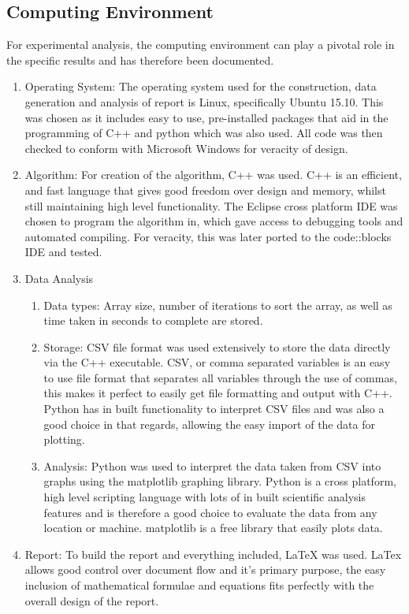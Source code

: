 \documentclass[]{article}
\begin{document}
\subsection{Computing Environment}
For experimental analysis, the computing environment can play a pivotal role in the specific results and has therefore been documented. 
\begin{enumerate}
	\item Operating System: The operating system used for the construction, data generation and analysis of report is Linux, specifically Ubuntu 15.10. This was chosen as it includes easy to use, pre-installed packages that aid in the programming of C++ and python which was also used. All code was then checked to conform with Microsoft Windows for veracity of design.
	\item Algorithm: For creation of the algorithm, C++ was used. C++ is an efficient, and fast language that gives good freedom over design and memory, whilst still maintaining high level functionality. The Eclipse cross platform IDE was chosen to program the algorithm in, which gave access to debugging tools and automated compiling. For veracity, this was later ported to the code::blocks IDE and tested.
	\item Data Analysis
\begin{enumerate}
	\item Data types: Array size, number of iterations to sort the array, as well as time taken in seconds to complete are stored.
	\item Storage: CSV file format was used extensively to store the data directly via the C++ executable. CSV, or comma separated variables is an easy to use file format that separates all variables through the use of commas, this makes it perfect to easily get file formatting and output with C++. Python has in built functionality to interpret CSV files and was also a good choice in that regards, allowing the easy import of the data for plotting.
	\item Analysis: Python was used to interpret the data taken from CSV into graphs using the matplotlib graphing library. Python is a cross platform, high level scripting language with lots of in built scientific analysis features and is therefore a good choice to evaluate the data from any location or machine. matplotlib is a free library that easily plots data. 
\end{enumerate}
	\item Report: To build the report and everything included, LaTeX was used. LaTex allows good control over document flow and it's primary purpose, the easy inclusion of mathematical formulae and equations fits perfectly with the overall design of the report.
\end{enumerate}
\end{document}
